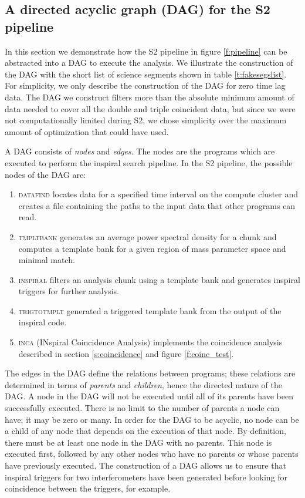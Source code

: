 \subsection{A directed acyclic graph (DAG) for the S2 pipeline}
\label{ss:dag}

In this section we demonstrate how the S2 pipeline in figure \ref{f:pipeline}
can be abstracted into a DAG to execute the analysis. We illustrate the
construction of the DAG with the short list of science segments shown in table
\ref{t:fakesegslist}. For simplicity, we only describe the construction of the
DAG for zero time lag data. The DAG we construct filters more than the
absolute minimum amount of data needed to cover all the double and triple
coincident data, but since we were not computationally limited during S2, we
chose simplicity over the maximum amount of optimization that could have used.

A DAG consists of \emph{nodes} and \emph{edges}. The nodes are the programs
which are executed to perform the inspiral search pipeline. In the S2
pipeline, the possible nodes of the DAG are:
\begin{enumerate}
\item\textsc{datafind} locates data for a specified time interval on the
compute cluster and creates a file containing the paths to the input data that
other programs can read.

\item\textsc{tmpltbank} generates an average power spectral density for a
chunk and computes a template bank for a given region of mass parameter space
and minimal match.

\item\textsc{inspiral} filters an analysis chunk using a template bank and
generates inspiral triggers for further analysis.

\item\textsc{trigtotmplt} generated a triggered template bank from the
output of the inspiral code.

\item\textsc{inca} (INspiral Coincidence Analysis) implements the
coincidence analysis described in section \ref{s:coincidence} and figure
\ref{f:coinc_test}.
\end{enumerate}
The edges in the DAG define the relations between programs; these relations
are determined in terms of \emph{parents} and \emph{children}, hence the
directed nature of the DAG. A node in the DAG will not be executed until all
of its parents have been successfully executed. There is no limit to the
number of parents a node can have; it may be zero or many. In order for the
DAG to be acyclic, no node can be a child of any node that depends on the
execution of that node. By definition, there must be at least one node in the
DAG with no parents. This node is executed first, followed by any other nodes
who have no parents or whose parents have previously executed.  The
construction of a DAG allows us to ensure that inspiral triggers for two
interferometers have been generated before looking for coincidence between the
triggers, for example.

